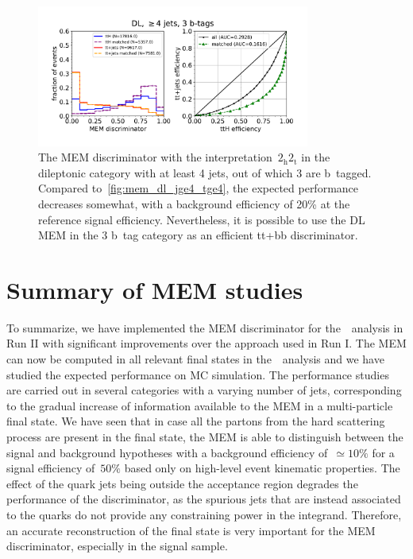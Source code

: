 \begin{figure}[ht]
\begin{centering}
\includegraphics[width = 0.8\textwidth]{figures/mem/mem_dl_jge4_t3.pdf}
\caption[MEM with the~$2_{\mathrm{h}} 2_{\mathrm{t}}$ interpretation in the dileptonic $\ge4$ jet, 3 b~tag category]{The MEM discriminator with the interpretation~$2_{\mathrm{h}} 2_{\mathrm{t}}$ in the dileptonic category with at least 4 jets, out of which 3 are b~tagged. Compared to~\cref{fig:mem_dl_jge4_tge4}, the expected performance decreases somewhat, with a background efficiency of 20\% at the reference signal efficiency. Nevertheless, it is possible to use the DL MEM in the 3 b~tag category as an efficient tt+bb discriminator.}
\label{fig:mem_dl_jge4_t3}
\end{centering}
\end{figure}

\section{Summary of MEM studies}
To summarize, we have implemented the MEM discriminator for the~\ttHbb~analysis in Run II with significant improvements over the approach used in Run I. The MEM can now be computed in all relevant final states in the~\ttHbb~analysis and we have studied the expected performance on MC simulation. The performance studies are carried out in several categories with a varying number of jets, corresponding to the gradual increase of information available to the MEM in a multi-particle final state. We have seen that in case all the partons from the hard scattering process are present in the final state, the MEM is able to distinguish between the signal and background hypotheses with a background efficiency of~$\simeq 10\%$ for a signal efficiency of~$50\%$ based only on high-level event kinematic properties. The effect of the quark jets being outside the acceptance region degrades the performance of the discriminator, as the spurious jets that are instead associated to the quarks do not provide any constraining power in the integrand. Therefore, an accurate reconstruction of the final state is very important for the MEM discriminator, especially in the signal sample.

